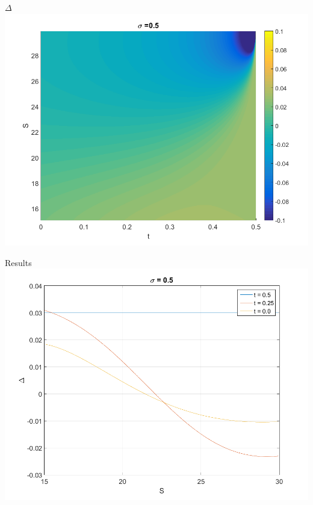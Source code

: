 \documentclass{beamer}
\numberwithin{equation}{section}
\begin{document}
\begin{frame}{$\Delta$}
\centering
\includegraphics[width=1\textwidth]{../plots/delta_field}
\end{frame}

\begin{frame}{Results}
    \centering
      \includegraphics[width=1\textwidth]{../plots/delta_lines}
\end{frame}
\end{document}
